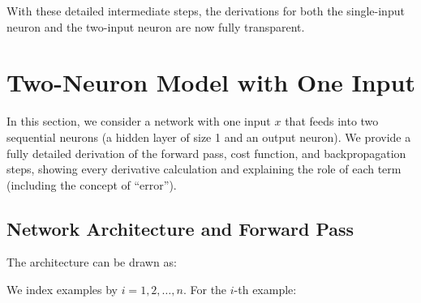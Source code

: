 \documentclass{article}
\begin{document}
\vspace{1em}
\noindent With these detailed intermediate steps, the derivations for both the single-input neuron and the two-input neuron are now fully transparent.

\section{Two-Neuron Model with One Input}\label{sec:two-neuron}

In this section, we consider a network with one input \(x\) that feeds into two sequential neurons (a hidden layer of size 1 and an output neuron).  We provide a fully detailed derivation of the forward pass, cost function, and backpropagation steps, showing every derivative calculation and explaining the role of each term (including the concept of “error”).

\subsection{Network Architecture and Forward Pass}\label{sec:two-neuron-forward}

\noindent The architecture can be drawn as:

\begin{center}
\end{center}

\noindent We index examples by \(i = 1,2,\dots,n\).  For the \(i\)-th example:
\end{document}
